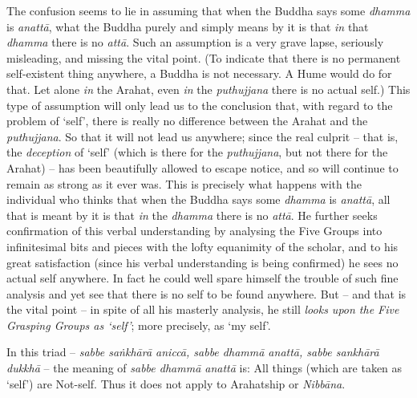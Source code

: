 The confusion seems to lie in assuming that when the Buddha says some \textit{dhamma} is \textit{anattā}, what the Buddha purely and simply means by it is that \emph{in} that \textit{dhamma} there is no \textit{attā}. Such an assumption is a very grave lapse, seriously misleading, and missing the vital point. (To indicate that there is no permanent self-existent thing anywhere, a Buddha is not necessary. A Hume would do for that. Let alone \emph{in} the Arahat, even \emph{in} the \textit{puthujjana} there is no actual self.) This type of assumption will only lead us to the conclusion that, with regard to the problem of `self', there is really no difference between the Arahat and the \textit{puthujjana}. So that it will not lead us anywhere; since the real culprit -- that is, the \emph{deception} of `self' (which is there for the \textit{puthujjana}, but not there for the Arahat) -- has been beautifully allowed to escape notice, and so will continue to remain as strong as it ever was. This is precisely what happens with the individual who thinks that when the Buddha says some \textit{dhamma} is \textit{anattā}, all that is meant by it is that \emph{in} the \textit{dhamma} there is no \textit{attā}. He further seeks confirmation of this verbal understanding by analysing the Five Groups into infinitesimal bits and pieces with the lofty equanimity of the scholar, and to his great satisfaction (since his verbal understanding is being confirmed) he sees no actual self anywhere. In fact he could well spare himself the trouble of such fine analysis and yet see that there is no self to be found anywhere. But -- and that is the vital point -- in spite of all his masterly analysis, he still \textit{looks upon the Five Grasping Groups as `self'}; more precisely, as `my self'.

In this triad -- \textit{sabbe saṅkhārā aniccā, sabbe dhammā anattā, sabbe sankhārā dukkhā} -- the meaning of \textit{sabbe dhammā anattā} is: All things (which are taken as `self') are Not-self. Thus it does not apply to Arahatship or \textit{Nibbāna}.

